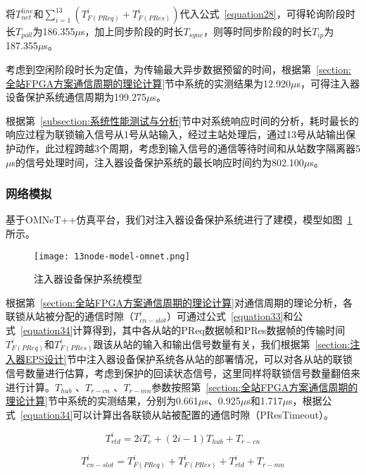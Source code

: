 将$T_{net}^{line}$和$\sum_{i=1}^{13}(T_{F(PReq)}^{i}+T_{F(PRes)}^{i})$代入公式~\ref{equation28}，可得轮询阶段时长$T_{poll}$为186.355$\mu$s，加上同步阶段的时长$T_{sync}$，则等时同步阶段的时长$T_{ip}$为187.355$\mu$s。

考虑到空闲阶段时长为定值，为传输最大异步数据预留的时间，根据第~\ref{section:全站FPGA方案通信周期的理论计算}节中系统的实测结果为12.920$\mu$s，可得注入器设备保护系统通信周期为199.275$\mu$s。


根据第~\ref{subsection:系统性能测试与分析}节中对系统响应时间的分析，耗时最长的响应过程为联锁输入信号从1号从站输入，经过主站处理后，通过13号从站输出保护动作，此过程跨越3个周期，考虑到输入信号的通信等待时间和从站数字隔离器5$\mu$s的信号处理时间，注入器设备保护系统的最长响应时间约为802.100$\mu$s。


\subsubsection{网络模拟}

基于OMNeT++仿真平台，我们对注入器设备保护系统进行了建模，模型如图~\ref{fig:13node-model-omnet}所示。

\begin{figure}[!htb]
  \centering
  \texttt{[image: 13node-model-omnet.png]}
  \caption{注入器设备保护系统模型}
  \label{fig:13node-model-omnet}
\end{figure}

根据第~\ref{section:全站FPGA方案通信周期的理论计算}对通信周期的理论分析，各联锁从站被分配的通信时隙（$T_{cn-slot}^{i}$）可通过公式~\ref{equation33}和公式~\ref{equation34}计算得到，其中各从站的PReq数据帧和PRes数据帧的传输时间$T_{F(PReq)}^{i}$和$T_{F(PRes)}^{i}$跟该从站的输入和输出信号数量有关，我们根据第~\ref{section:注入器EPS设计}节中注入器设备保护系统各从站的部署情况，可以对各从站的联锁信号数量进行估算，考虑到保护的回读状态信号，这里同样将联锁信号数量翻倍来进行计算。$T_{hub}$ 、$T_{r-cn}$ 、$T_{r-mn}$参数按照第~\ref{section:全站FPGA方案通信周期的理论计算}节中系统的实测结果，分别为0.661$\mu$s、0.925$\mu$s和1.717$\mu$s，根据公式~\ref{equation34}可以计算出各联锁从站被配置的通信时隙（PResTimeout）。

\begin{equation}
\label{equation33}
T_{rtd}^{i}=2iT_{c}+(2i-1)T_{hub}+T_{r-cn}
\end{equation}

\begin{equation}
\label{equation34}
T_{cn-slot}^{i}=T_{F(PReq)}^{i}+T_{F(PRes)}^{i}+T_{rtd}^{i}+T_{r-mn}
\end{equation}

